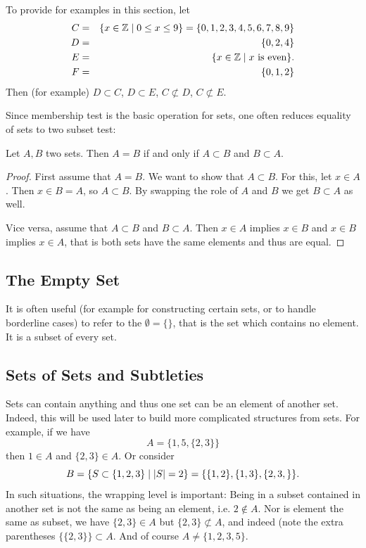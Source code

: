 To provide for examples in this section, let 
\begin{eqnarray*}
C&=&\{x\in{\mathbb Z}\mid 0\le x\le9\}=\{0,1,2,3,4,5,6,7,8,9\}\\
D&=&\{0,2,4\}\\
E&=&\{x\in{\mathbb Z}\mid \mbox{$x$ is even}\}.\\
F&=&\{0,1,2\}\\
\end{eqnarray*}
Then (for example) $D\subset C$, $D\subset E$, $C\not\subset D$,
$C\not\subset E$.

Since membership test is the basic operation for sets, one often reduces
equality of sets to two subset test:
\begin{lemma}
Let $A,B$ two sets. Then $A=B$ if and only if $A\subset B$ and $B\subset A$.
\end{lemma}
\begin{proof}
First assume that $A=B$. We want to show that $A\subset B$. For this, let
$x\in A$. Then $x\in B=A$, so $A\subset B$. By swapping the role of $A$ and
$B$ we get $B\subset A$ as well.

Vice versa, assume that $A\subset B$ and $B\subset A$. Then $x\in A$ implies
$x\in B$ and $x\in B$ implies $x\in A$, that is both sets have the same
elements and thus are equal.
\end{proof}

\subsection{The Empty Set}

It is often useful (for example for constructing certain sets, or to handle
borderline cases) to refer to the  $\emptyset=\{\}$, that
is the set which contains no element. It is a subset of every set.

\subsection{Sets of Sets and Subtleties}

Sets can contain anything and thus one set can be an element of another set.
Indeed, this will be used later to build more complicated structures from
sets.
For example, if we have
\[
A=\{1,5,\{2,3\}\}
\]
then $1\in A$ and $\{2,3\}\in A$. Or consider
\[
B=\{S\subset\{1,2,3\}\mid \left|S\right|=2\}=\{\{1,2\},\{1,3\},\{2,3,\}\}.
\]
In such situations, the wrapping level is important: 
Being in a subset contained in another set is not the same as being an
element, i.e. $2\not\in A$. Nor is element the same as subset, we have
$\{2,3\}\in A$ but $\{2,3\}\not\subset A$, and indeed (note the extra
parentheses $\{\{2,3\}\}\subset A$. And of course $A\not=\{1,2,3,5\}$.

